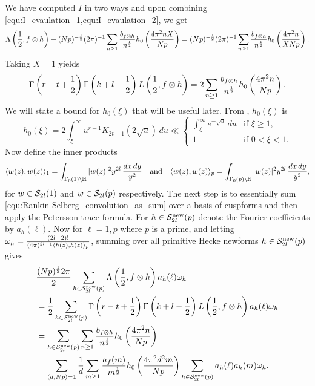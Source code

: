 \documentclass[12pt,reqno,oneside]{amsart}
\begin{document}
    We have computed $I$ in two ways and upon combining \cref{equ:I_evaulation_1,equ:I_evaulation_2}, we get
    \[
        \Lambda\left(\frac{1}{2},f \otimes h\right)-(Np)^{-\frac{1}{2}}(2\pi)^{-1}\sum_{n \ge 1}\frac{b_{f \otimes h}}{n^{\frac{1}{2}}}h_{0}\left(\frac{4\pi^{2}nX}{Np}\right) = (Np)^{-\frac{1}{2}}(2\pi)^{-1}\sum_{n \ge 1}\frac{b_{f \otimes h}}{n^{\frac{1}{2}}}h_{0}\left(\frac{4\pi^{2}n}{XNp}\right).
    \]
    Taking $X = 1$ yields
    \begin{equation}\label{equ:Rankin-Selberg_convolution_as_sum}
        \Gamma\left(r-t+\frac{1}{2}\right)\Gamma\left(k+l-\frac{1}{2}\right)L\left(\frac{1}{2},f \otimes h\right) = 2\sum_{n \ge 1}\frac{b_{f \otimes h}}{n^{\frac{1}{2}}}h_{0}\left(\frac{4\pi^{2}n}{Np}\right).
    \end{equation}
    We will state a bound for $h_{0}(\xi)$ that will be useful later. From \cite{GR}, $h_{0}(\xi)$ is
    \begin{equation}\label{equ:h_bound}
        h_{0}(\xi) = 2\int_{\xi}^{\infty}u^{r-1}K_{2t-1}(2\sqrt{u})\,du \ll \begin{cases} \int_{\xi}^{\infty}e^{-\sqrt{u}}\,du & \text{if $\xi \ge 1$}, \\ 1 & \text{if $0 < \xi < 1$}. \end{cases}
    \end{equation}
    Now define the inner products
    \[
        \langle w(z),w(z)\rangle_{1} = \int_{\Gamma_{0}(1)\backslash\mathbb{H}}|w(z)|^{2}y^{2l}\,\frac{dx\,dy}{y^{2}} \quad \text{and} \quad \langle w(z),w(z)\rangle_{p} = \int_{\Gamma_{0}(p)\backslash\mathbb{H}}|w(z)|^{2}y^{2l}\,\frac{dx\,dy}{y^{2}},
    \]
    for $w \in \mathcal{S}_{2l}(1)$ and $w \in \mathcal{S}_{2l}(p)$ respectively. The next step is to essentially sum \cref{equ:Rankin-Selberg_convolution_as_sum} over a basis of cuspforms and then apply the Petersson trace formula. For $h \in \mathcal{S}_{2l}^{\text{new}}(p)$ denote the Fourier coefficients by $a_{h}(\ell)$. Now for $\ell = 1,p$ where $p$ is a prime, and letting $\omega_{h} = \frac{(2l-2)!}{(4\pi)^{2l-1}\langle h(z),h(z)\rangle_{p}}$, summing over all primitive Hecke newforms $h \in \mathcal{S}_{2l}^{\text{new}}(p)$ gives
    \begin{equation}\label{equ:large_computation_1}
        \begin{aligned}
            &\frac{(Np)^{\frac{1}{2}}2\pi}{2}\sum_{h \in \mathcal{S}_{2l}^{\text{new}}(p)}\Lambda\left(\frac{1}{2},f \otimes h\right)a_{h}(\ell)\omega_{h} \\
            &= \frac{1}{2}\sum_{h \in \mathcal{S}_{2l}^{\text{new}}(p)}\Gamma\left(r-t+\frac{1}{2}\right)\Gamma\left(k+l-\frac{1}{2}\right)L\left(\frac{1}{2},f \otimes h\right)a_{h}(\ell)\omega_{h} \\
            &= \sum_{h \in \mathcal{S}_{2l}^{\text{new}}(p)}\sum_{n \ge 1}\frac{b_{f \otimes h}}{n^{\frac{1}{2}}}h_{0}\left(\frac{4\pi^{2}n}{Np}\right) \\
            &= \sum_{(d,Np) = 1}\frac{1}{d}\sum_{m \ge 1}\frac{a_{f}(m)}{m^{\frac{1}{2}}}h_{0}\left(\frac{4\pi^{2}d^{2}m}{Np}\right)\sum_{h \in \mathcal{S}_{2l}^{\text{new}}(p)}a_{h}(\ell)a_{h}(m)\omega_{h}.
        \end{aligned}
    \end{equation}
\end{document}
